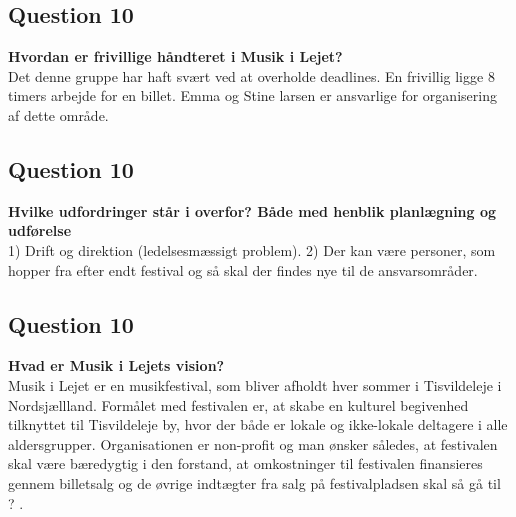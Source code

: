 \subsection{Question 10}
\noindent \textbf{Hvordan er frivillige håndteret i Musik i Lejet?} \\
Det denne gruppe har haft svært ved at overholde deadlines. En frivillig ligge 8 timers arbejde for en billet. Emma og Stine larsen er ansvarlige for organisering af dette område.


\subsection{Question 10}
\noindent \textbf{Hvilke udfordringer står i overfor? Både med henblik planlægning og udførelse} \\
1) Drift og direktion (ledelsesmæssigt problem). 
2) Der kan være personer, som hopper fra efter endt festival og så skal der findes nye til de ansvarsområder.


\subsection{Question 10}
\noindent \textbf{Hvad er Musik i Lejets vision?} \\
Musik i Lejet er en musikfestival, som bliver afholdt hver sommer i Tisvildeleje i Nordsjællland. Formålet med festivalen er, at skabe en kulturel begivenhed tilknyttet til Tisvildeleje by, hvor der både er lokale og ikke-lokale deltagere i alle aldersgrupper. Organisationen er non-profit og man ønsker således, at festivalen skal være bæredygtig i den forstand, at omkostninger til festivalen finansieres gennem billetsalg og de øvrige indtægter fra salg på festivalpladsen skal så gå til ? . 
